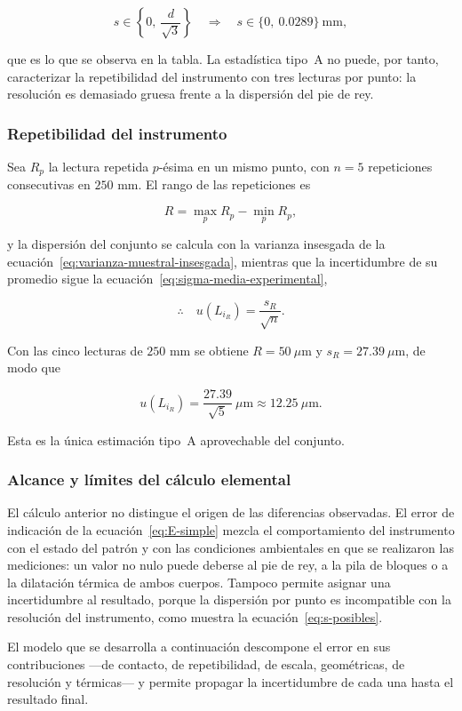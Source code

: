 \begin{equation}
    s \in \left\{ 0,\ \frac{d}{\sqrt{3}} \right\}
    \quad\Longrightarrow\quad
    s \in \{ 0,\ 0.0289 \}\ \text{mm},
    \label{eq:s-posibles}
\end{equation}

que es lo que se observa en la tabla. La estadística tipo~A no puede, por tanto,
caracterizar la repetibilidad del instrumento con tres lecturas por punto: la
resolución es demasiado gruesa frente a la dispersión del pie de rey.

\subsubsection*{Repetibilidad del instrumento}

Sea $R_p$ la lectura repetida $p$-ésima en un mismo punto, con $n = 5$ repeticiones
consecutivas en $250$ mm. El rango de las repeticiones es

\begin{equation}
    R = \max_p R_p - \min_p R_p,
    \label{eq:rango-repetidas}
\end{equation}

y la dispersión del conjunto se calcula con la varianza insesgada de la
ecuación~\eqref{eq:varianza-muestral-insesgada}, mientras que la incertidumbre de su
promedio sigue la ecuación~\eqref{eq:sigma-media-experimental},

\begin{equation}
    \therefore\quad
    u(L_{i_R}) = \frac{s_R}{\sqrt{n}} .
    \label{eq:sigma-LiR-simple}
\end{equation}

Con las cinco lecturas de $250$ mm se obtiene $R = 50\ \mu\text{m}$ y
$s_R = 27.39\ \mu\text{m}$, de modo que

\begin{equation}
    u(L_{i_R}) = \frac{27.39}{\sqrt{5}}\ \mu\text{m}
    \approx 12.25\ \mu\text{m}.
    \label{eq:sigma-LiR-simple-valor}
\end{equation}

Esta es la única estimación tipo~A aprovechable del conjunto.

\subsubsection*{Alcance y límites del cálculo elemental}

El cálculo anterior no distingue el origen de las diferencias observadas. El error de
indicación de la ecuación~\eqref{eq:E-simple} mezcla el comportamiento del
instrumento con el estado del patrón y con las condiciones ambientales en que se
realizaron las mediciones: un valor no nulo puede deberse al pie de rey, a la pila de
bloques o a la dilatación térmica de ambos cuerpos. Tampoco permite asignar una
incertidumbre al resultado, porque la dispersión por punto es incompatible con la
resolución del instrumento, como muestra la ecuación~\eqref{eq:s-posibles}.

El modelo que se desarrolla a continuación descompone el error en sus contribuciones
—de contacto, de repetibilidad, de escala, geométricas, de resolución y térmicas— y
permite propagar la incertidumbre de cada una hasta el resultado final.
